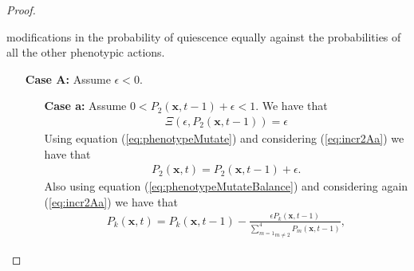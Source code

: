 \documentclass[\main/thesis.tex]{subfiles}
\begin{document}
\begin{proof}
\begin{itemize}
                                                modifications in the probability of quiescence equally against the
                                                probabilities of all the other phenotypic actions.
                           \begin{itemize}
                             \item[{\bf Case A:}] Assume $\epsilon {<} 0$.
                             \begin{itemize}
                               \item[{\bf Case a:}] Assume $0 {<} P_2(\boldsymbol{x}, t{-}1) {+} \epsilon {<} 1$.
                                                    We have that 
                                                    \begin{align*}
                                                      \Xi(\epsilon, P_2(\boldsymbol{x}, t{-}1)) {=} \epsilon
                                                      \tag{18}
                                                      \label{eq:incr2Aa}
                                                    \end{align*}
                                                    Using equation (\ref{eq:phenotypeMutate}) and considering 
                                                    (\ref{eq:incr2Aa}) we have that
                                                    \begin{align*}
                                                      P_2(\boldsymbol{x}, t) {=} P_2(\boldsymbol{x}, t{-}1) {+} \epsilon.
                                                      \tag{19}
                                                      \label{eq:P22Aa}
                                                    \end{align*}
                                                    Also using equation (\ref{eq:phenotypeMutateBalance}) and considering 
                                                    again (\ref{eq:incr2Aa}) we have that
                                                    \begin{align*}
                                                      P_k(\boldsymbol{x}, t) {=} P_k(\boldsymbol{x}, t{-}1) 
                                                                             {-} \frac{\epsilon P_k(\boldsymbol{x}, t{-}1)}
                                                                                      {\underset{m {\ne} 2}{\sum_{m{=}1}^4} 
                                                                                       P_m(\boldsymbol{x}, t{-}1)},

\end{align*}
\end{itemize}
\end{itemize}
\end{itemize}
\end{proof}
\end{document}
